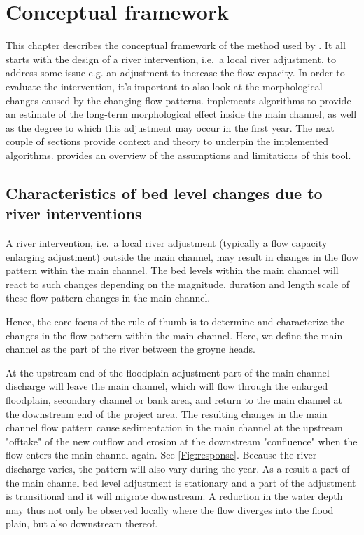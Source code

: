 \chapter{Conceptual framework} \label{Chp:Concepts}

This chapter describes the conceptual framework of the method used by \dfastmi.
It all starts with the design of a river intervention, i.e.~a local river adjustment, to address some issue e.g. an adjustment to increase the flow capacity.
In order to evaluate the intervention, it's important to also look at the morphological changes caused by the changing flow patterns.
\dfastmi implements algorithms to provide an estimate of the long-term morphological effect inside the main channel, as well as the degree to which this adjustment may occur in the first year.
The next couple of sections provide context and theory to underpin the implemented algorithms.
 provides an overview of the assumptions and limitations of this tool.


\section{Characteristics of bed level changes due to river interventions}

A river intervention, i.e.~a local river adjustment (typically a flow capacity enlarging adjustment) outside the main channel, may result in changes in the flow pattern within the main channel.
The bed levels within the main channel will react to such changes depending on the magnitude, duration and length scale of these flow pattern changes in the main channel.

Hence, the core focus of the rule-of-thumb is to determine and characterize the changes in the flow pattern within the main channel.
Here, we define the main channel as the part of the river between the groyne heads.

At the upstream end of the floodplain adjustment part of the main channel discharge will leave the main channel, which will flow through the enlarged floodplain, secondary channel or bank area, and return to the main channel at the downstream end of the project area.
The resulting changes in the main channel flow pattern cause sedimentation in the main channel at the upstream "offtake" of the new outflow and erosion at the downstream "confluence" when the flow enters the main channel again.
See \autoref{Fig:response}.
Because the river discharge varies, the pattern will also vary during the year.
As a result a part of the main channel bed level adjustment is stationary and a part of the adjustment is transitional and it will migrate downstream.
A reduction in the water depth may thus not only be observed locally where the flow diverges into the flood plain, but also downstream thereof.

